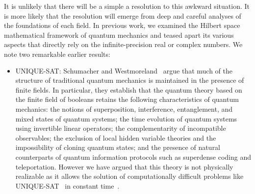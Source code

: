 \documentclass{article}
\theoremstyle{remark}
\begin{document}
It is unlikely that there will be a simple a resolution to this
awkward situation. It is more likely that the resolution will emerge
from deep and careful analyses of the foundations of each field. In
previous work, we examined the Hilbert space mathematical framework of
quantum mechanics and teased apart its various aspects that directly
rely on the infinite-precision real or complex numbers. We note two
remarkable earlier results:
\begin{itemize}
\item UNIQUE-SAT: Schumacher and
  Westmoreland~\cite{Schumacher2012-SCHMQT} argue that much of the
  structure of traditional quantum mechanics is maintained in the
  presence of finite fields. In particular, they establish that the
  quantum theory based on the finite field of booleans retains the
  following characteristics of quantum mechanics: the notions of
  superposition, interference, entanglement, and mixed states of
  quantum systems; the time evolution of quantum systems using
  invertible linear operators; the complementarity of incompatible
  observables; the exclusion of local hidden variable theories and the
  impossibility of cloning quantum states; and the presence of natural
  counterparts of quantum information protocols such as superdense
  coding and teleportation. However we have argued that this theory is
  not physically realizable as it allows the solution of
  computationally difficult problems like
  UNIQUE-SAT~\cite{Valiant198685} in constant time~\cite{usat}.


\end{itemize}
\end{document}
